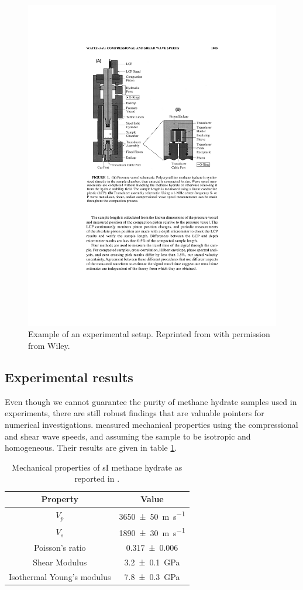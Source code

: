 \begin{figure}
\centering
\includegraphics[width=12cm]{../pictures/experimentalsetup.pdf}
\caption{Example of an experimental setup. Reprinted from \citet{Waite2000} with permission from Wiley.}
\label{fig:experimental_setup}
\end{figure}

\subsection{Experimental results}
Even though we cannot guarantee the purity of methane hydrate samples used in experiments, there are still robust findings that are valuable pointers for numerical investigations. \citet{Waite2000} measured mechanical properties using the compressional and shear wave speeds, and assuming the sample to be isotropic and homogeneous. Their results are given in table \ref{tbl:si_mech_exp}.

\begin{table}
\caption{Mechanical properties of sI methane hydrate as reported in \cite{Waite2000}.}
\label{tbl:si_mech_exp}
\centering
\begin{tabular}{c|c}
Property & Value \\
\hline
$V_p$ & \SI{3650\pm 50}{\meter\per\second} \\
$V_s$ & \SI{1890\pm 30}{\meter\per\second} \\
Poisson's ratio & \SI{0.317 \pm 0.006}{} \\
Shear Modulus & \SI{3.2\pm0.1}{\giga\pascal} \\
Isothermal Young's modulus & \SI{7.8\pm 0.3}{\giga\pascal}
\end{tabular}
\end{table}

